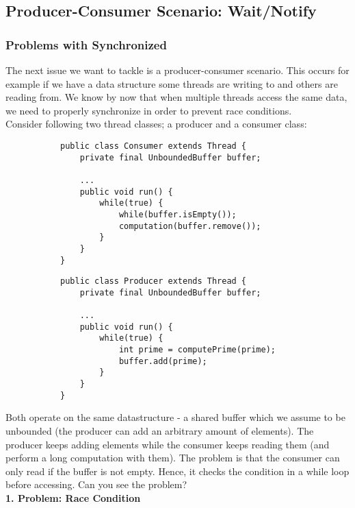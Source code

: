 \documentclass[main.tex]{subfiles}
\begin{document}
\subsection{Producer-Consumer Scenario: Wait/Notify}
\subsubsection{Problems with Synchronized}
The next issue we want to tackle is a producer-consumer scenario. This occurs for example if we have a data structure some threads are writing to and others are reading from. We know by now that when multiple threads access the same data, we need to properly synchronize in order to prevent race conditions.\\[3mm]
Consider following two thread classes; a producer and a consumer class:
    \begin{figure}[H]
        \begin{subfigure}{.52\textwidth}
            \begin{verbatim}
public class Consumer extends Thread {
    private final UnboundedBuffer buffer;

    ...
    public void run() {
        while(true) {
            while(buffer.isEmpty());
            computation(buffer.remove());
        }
    }
}
            \end{verbatim}
        \end{subfigure}%
        \begin{subfigure}{.52\textwidth}
            \begin{verbatim}
public class Producer extends Thread {
    private final UnboundedBuffer buffer;

    ...
    public void run() {
        while(true) {
            int prime = computePrime(prime);
            buffer.add(prime);
        }
    }
}
            \end{verbatim}
        \end{subfigure}
    \end{figure}
Both operate on the same datastructure - a shared buffer which we assume to be unbounded (the producer can add an arbitrary amount of elements). The producer keeps adding elements while the consumer keeps reading them (and perform a long computation with them). The problem is that the consumer can only read if the buffer is not empty. Hence, it checks the condition in a while loop before accessing. Can you see the problem?\\[3mm]
\textbf{1. Problem: Race Condition}\\
\end{document}
